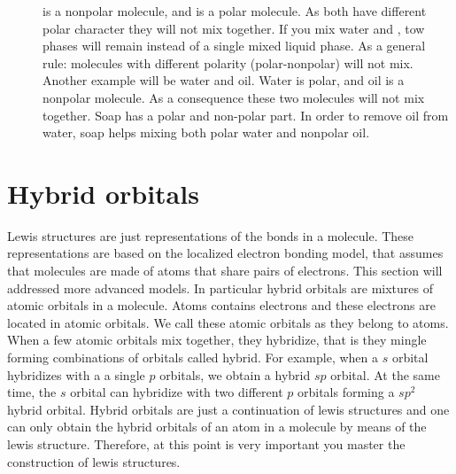 \documentclass[main.tex]{subfiles}
\begin{document}
\begin{description}
\item[]  is a nonpolar molecule, and  is a polar molecule. As both have different polar character they will not mix together. If you mix water and , tow phases will remain instead of a single mixed liquid phase.
As a general rule: molecules with different polarity (polar-nonpolar) will not mix. Another example will be water and oil. Water is polar, and oil is a nonpolar molecule. As a consequence these two molecules will not mix together. Soap has a polar and non-polar part. In order to remove oil from water, soap helps mixing both polar water and nonpolar oil.

\end{description}


\section{Hybrid orbitals}
Lewis structures are just representations of the bonds in a molecule. These representations are based on the localized electron bonding model, that assumes that molecules are made of atoms that share pairs of electrons. This section will addressed more advanced models. In particular hybrid orbitals are mixtures of atomic orbitals in a molecule. Atoms contains electrons and these electrons are located in atomic orbitals. We call these atomic orbitals as they belong to atoms. When a few atomic orbitals mix together, they hybridize, that is they mingle forming combinations of orbitals called hybrid. For example, when a $s$ orbital hybridizes with a a single $p$ orbitals, we obtain a hybrid $sp$ orbital. At the same time, the $s$ orbital can hybridize with two different $p$ orbitals forming a $sp^2$ hybrid orbital. Hybrid orbitals are just a continuation of lewis structures and one can only obtain the hybrid orbitals of an atom in a molecule by means of the lewis structure. Therefore, at this point is very important you master the construction of lewis structures. 
\end{document}
